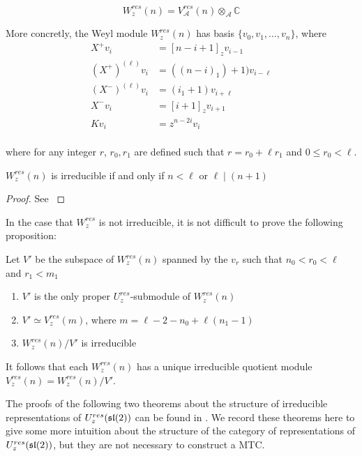 \begin{equation}
    W_z^{res}(n) = V_\mathcal{A}^{res}(n) \otimes_\mathcal{A} \mathbb{C}
\end{equation}


More concretly, the Weyl module $W_z^{res}(n)$ has basis $\{v_0, v_1, \ldots, v_n\}$, where
\begin{align}
    X^+ v_i &= [n-i+1]_z v_{i-1} \\
    (X^+)^{(\ell)} v_i &= ( (n-i)_1) + 1) v_{i-\ell} \\
    (X^-)^{(\ell)} v_i &= ( i_1 + 1) v_{i+\ell} \\
    X^-v_i &= [i+1]_z v_{i+1} \\
    Kv_i &= z^{n-2i} v_i \\
\end{align}

where for any integer $r$, $r_0,r_1$ are defined such that $r = r_0 + \ell r_1$
and $0 \leq r_0 < \ell$. 

\begin{claim} $W_z^{res}(n)$ is irreducible if and only if $n < \ell$ or $\ell \mid (n+1)$
\end{claim}
\begin{proof}
See \cite{CP}
\end{proof}

In the case that $W_z^{res}$ is not irreducible, it is not difficult to prove the following proposition:

\begin{prop}
Let $V'$ be the subspace of $W_z^{res}(n)$ spanned by the $v_r$ such that $n_0 < r_0 < \ell$ and $r_1 < m_1$
\begin{enumerate}
    \renewcommand{\labelenumi}{\roman{enumi})}
    \item $V'$ is the only proper $U_z^{res}$-submodule of $W_z^{res}(n)$
    \item $V' \simeq V_z^{res}(m)$, where $m = \ell - 2 - n_0 + \ell(n_1 - 1)$
    \item $W_z^{res}(n) / V'$ is irreducible
\end{enumerate}
\end{prop}

It follows that each $W_z^{res}(n)$ has a unique irreducible quotient module $V_z^{res}(n) = W_z^{res}(n) / V'$. 

The proofs of the following two theorems about the structure of irreducible
representations of $U_z^{res}(\mathfrak{sl}(2))$ can be found in \cite{CP}. We record
these theorems here to give some more intuition about the structure of the
category of representations of $U_z^{res}(\mathfrak{sl}(2))$, but they are not necessary
to construct a MTC.

